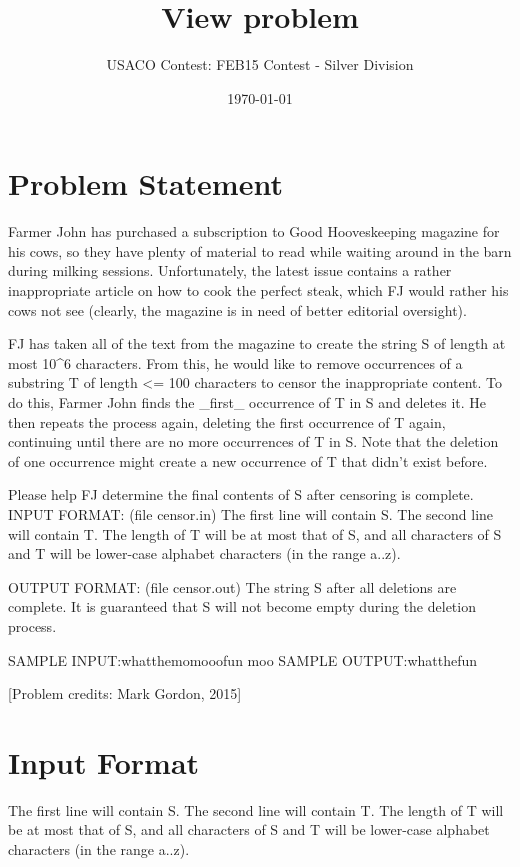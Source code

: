\documentclass[12pt]{article}
\title{View problem}
\author{USACO Contest: FEB15 Contest - Silver Division}
\date{\today}
\begin{document}
\maketitle

\section*{Problem Statement}

Farmer John has purchased a subscription to Good Hooveskeeping
magazine for his cows, so they have plenty of material to read while
waiting around in the barn during milking sessions.  Unfortunately,
the latest issue contains a rather inappropriate article on how to
cook the perfect steak, which FJ would rather his cows not see
(clearly, the magazine is in need of better editorial oversight).

FJ has taken all of the text from the magazine to create the string S
of length at most 10^6 characters.  From this, he would like to remove
occurrences of a substring T of length <= 100 characters to censor
the inappropriate content.  To do this, Farmer John finds the _first_
occurrence of T in S and deletes it.  He then repeats the process
again, deleting the first occurrence of T again, continuing until
there are no more occurrences of T in S.  Note that the deletion of
one occurrence might create a new occurrence of T that didn't
exist before.

Please help FJ determine the final contents of S after censoring is
complete.
INPUT FORMAT: (file censor.in)
The first line will contain S.  The second line will contain T.  The
length of T will be at most that of S, and all characters of S and T
will be lower-case alphabet characters (in the range a..z).

OUTPUT FORMAT: (file censor.out)
The string S after all deletions are complete.  It is guaranteed that
S will not become empty during the deletion process.

SAMPLE INPUT:whatthemomooofun
moo
SAMPLE OUTPUT:whatthefun

[Problem credits: Mark Gordon, 2015]



\section*{Input Format}
The first line will contain S.  The second line will contain T.  The
length of T will be at most that of S, and all characters of S and T
will be lower-case alphabet characters (in the range a..z).
\end{document}

